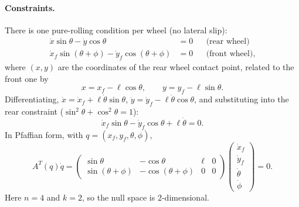 \documentclass[11pt,a4paper]{article}
\def\boldsymbol#1{#1}%
\newcommand{\q}{\boldsymbol{q}}
\theoremstyle{definition}
\theoremstyle{plain}
\theoremstyle{remark}
\begin{document}
\paragraph{Constraints.} There is one pure-rolling condition per wheel (no lateral slip):
\begin{align}
  \dot x\sin\theta-\dot y\cos\theta&=0 &&\text{(rear wheel)}\\
  \dot x_f\sin(\theta+\phi)-\dot y_f\cos(\theta+\phi)&=0 &&\text{(front wheel)},
\end{align}
where $(x,y)$ are the coordinates of the rear wheel contact point, related to the front one by
\[
  x=x_f-\ell\cos\theta,\qquad y=y_f-\ell\sin\theta .
\]
Differentiating, $\dot x=\dot x_f+\ell\dot\theta\sin\theta$, $\dot y=\dot y_f-\ell\dot\theta\cos\theta$, and substituting into the rear constraint ($\sin^2\theta+\cos^2\theta=1$):
\[
  \dot x_f\sin\theta-\dot y_f\cos\theta+\ell\dot\theta=0 .
\]
In Pfaffian form, with $\q=(x_f,y_f,\theta,\phi)$,
\begin{equation}
  A^T(\q)\dot\q=
  \begin{pmatrix}
    \sin\theta & -\cos\theta & \ell & 0\\
    \sin(\theta+\phi) & -\cos(\theta+\phi) & 0 & 0
  \end{pmatrix}
  \begin{pmatrix}\dot x_f\\ \dot y_f\\ \dot\theta\\ \dot\phi\end{pmatrix}=0 .
\end{equation}
Here $n=4$ and $k=2$, so the null space is 2-dimensional.
\end{document}

